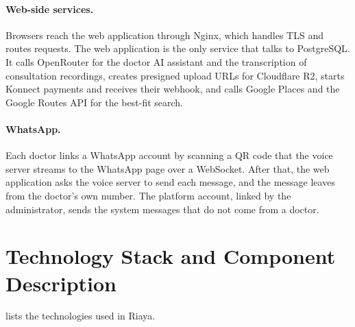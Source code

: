 \paragraph{Web-side services.} Browsers reach the web application through Nginx, which handles TLS and routes requests. The web application is the only service that talks to PostgreSQL. It calls OpenRouter for the doctor AI assistant and the transcription of consultation recordings, creates presigned upload URLs for Cloudflare R2, starts Konnect payments and receives their webhook, and calls Google Places and the Google Routes API for the best-fit search.

\paragraph{WhatsApp.} Each doctor links a WhatsApp account by scanning a QR code that the voice server streams to the WhatsApp page over a WebSocket. After that, the web application asks the voice server to send each message, and the message leaves from the doctor's own number. The platform account, linked by the administrator, sends the system messages that do not come from a doctor.

\section{Technology Stack and Component Description}\label{sec:stack}
 lists the technologies used in Riaya.

